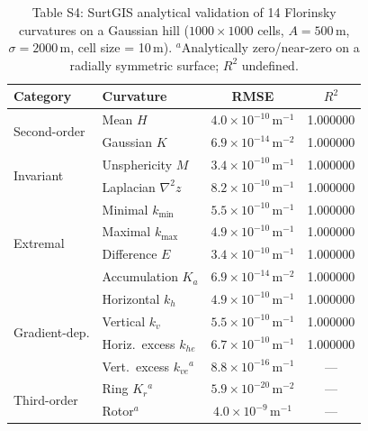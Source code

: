\documentclass[11pt]{article}
\begin{document}
\begin{table}[htbp]
\centering
\caption*{Table S4: SurtGIS analytical validation of 14 Florinsky curvatures on a Gaussian hill ($1000 \times 1000$ cells, $A=500$\,m, $\sigma=2000$\,m, cell size = 10\,m). $^{a}$Analytically zero/near-zero on a radially symmetric surface; $R^2$ undefined.}
\small
\begin{tabular}{@{}llcc@{}}
\toprule
Category & Curvature & RMSE & $R^2$ \\
\midrule
\multirow{2}{*}{Second-order}
 & Mean $H$              & $4.0 \times 10^{-10}$\,m$^{-1}$ & 1.000000 \\
 & Gaussian $K$          & $6.9 \times 10^{-14}$\,m$^{-2}$ & 1.000000 \\
\midrule
\multirow{2}{*}{Invariant}
 & Unsphericity $M$      & $3.4 \times 10^{-10}$\,m$^{-1}$ & 1.000000 \\
 & Laplacian $\nabla^2 z$ & $8.2 \times 10^{-10}$\,m$^{-1}$ & 1.000000 \\
\midrule
\multirow{4}{*}{Extremal}
 & Minimal $k_{\min}$    & $5.5 \times 10^{-10}$\,m$^{-1}$ & 1.000000 \\
 & Maximal $k_{\max}$    & $4.9 \times 10^{-10}$\,m$^{-1}$ & 1.000000 \\
 & Difference $E$        & $3.4 \times 10^{-10}$\,m$^{-1}$ & 1.000000 \\
 & Accumulation $K_a$    & $6.9 \times 10^{-14}$\,m$^{-2}$ & 1.000000 \\
\midrule
\multirow{4}{*}{Gradient-dep.}
 & Horizontal $k_h$      & $4.9 \times 10^{-10}$\,m$^{-1}$ & 1.000000 \\
 & Vertical $k_v$        & $5.5 \times 10^{-10}$\,m$^{-1}$ & 1.000000 \\
 & Horiz.\ excess $k_{he}$ & $6.7 \times 10^{-10}$\,m$^{-1}$ & 1.000000 \\
 & Vert.\ excess $k_{ve}$$^{a}$ & $8.8 \times 10^{-16}$\,m$^{-1}$ & --- \\
\midrule
\multirow{2}{*}{Third-order}
 & Ring $K_r$$^{a}$      & $5.9 \times 10^{-20}$\,m$^{-2}$ & --- \\
 & Rotor$^{a}$           & $4.0 \times 10^{-9}$\,m$^{-1}$ & --- \\
\bottomrule
\end{tabular}
\end{table}
\end{document}
